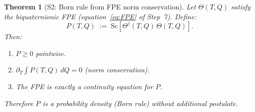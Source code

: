 \documentclass[12pt,a4paper]{article}
\newtheorem{theorem}{Theorem}[section]
\theoremstyle{definition}
\theoremstyle{remark}
\begin{document}
\begin{theorem}[S2: Born rule from FPE norm conservation]
\label{thm:S2}
Let $\Theta(T,Q)$ satisfy the biquaternionic FPE (equation~\eqref{eq:FPE}
of Step~7).  Define:
\begin{equation}
  P(T,Q) \;:=\; \mathrm{Sc}[\Theta^\dagger(T,Q)\,\Theta(T,Q)].
\end{equation}
Then:
\begin{enumerate}
  \item $P \geq 0$ pointwise.
  \item $\partial_T \int P(T,Q)\,dQ = 0$ (norm conservation).
  \item The FPE is exactly a continuity equation for $P$.
\end{enumerate}
Therefore $P$ is a probability density (Born rule) without additional
postulate.
\end{theorem}
\end{document}

